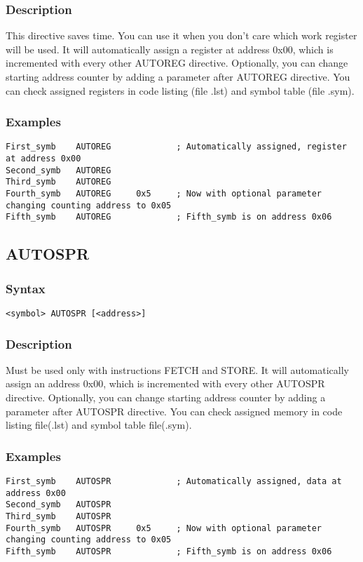         \subsubsection{Description}
            This directive saves time. You can use it when you don't care which work register will be used. It will automatically assign a register at address 0x00, which is incremented with every other AUTOREG directive. Optionally, you can change starting address counter by adding a parameter after AUTOREG directive. You can check assigned registers in code listing (file .lst) and symbol table (file .sym).

        \subsubsection{Examples}
            \verb'First_symb    AUTOREG             ; Automatically assigned, register at address 0x00'\\
            \verb'Second_symb   AUTOREG'\\
            \verb'Third_symb    AUTOREG'\\
            \verb'Fourth_symb   AUTOREG     0x5     ; Now with optional parameter changing counting address to 0x05'\\
            \verb'Fifth_symb    AUTOREG             ; Fifth_symb is on address 0x06'

    \subsection{AUTOSPR}
        \subsubsection{Syntax}
            \verb'<symbol> AUTOSPR [<address>]'

    \subsubsection{Description}
        Must be used only with instructions FETCH and STORE. It will automatically assign an address 0x00, which is incremented with every other AUTOSPR directive. Optionally, you can change starting address counter by adding a parameter after AUTOSPR directive. You can check assigned memory in code listing file(.lst) and symbol table file(.sym).

    \subsubsection{Examples}
        \verb'First_symb    AUTOSPR             ; Automatically assigned, data at address 0x00'\\
        \verb'Second_symb   AUTOSPR'\\
        \verb'Third_symb    AUTOSPR'\\
        \verb'Fourth_symb   AUTOSPR     0x5     ; Now with optional parameter changing counting address to 0x05'\\
        \verb'Fifth_symb    AUTOSPR             ; Fifth_symb is on address 0x06'

